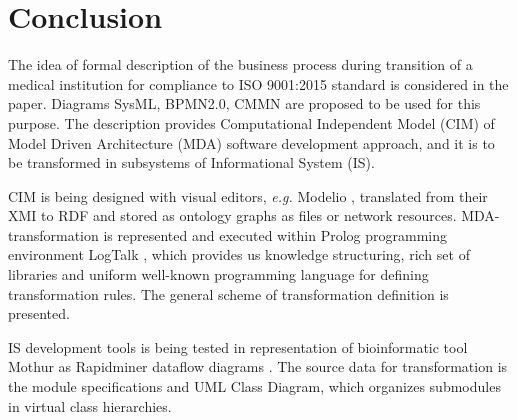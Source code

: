 \documentclass[conference]{IEEEtran}
\begin{document}


\section{Conclusion}

The idea of formal description of the business process during transition of a medical institution for compliance to ISO 9001:2015 standard is considered in the paper.  Diagrams SysML, BPMN2.0, CMMN are proposed to be used for this purpose.  The description provides Computational Independent Model (CIM) of Model Driven Architecture
(MDA) software development approach, and it is to be transformed in subsystems of Informational System (IS).

CIM is being designed with visual editors, \emph{e.g.} Modelio \cite{modelio}, translated from their XMI to RDF and stored as ontology graphs as files or network resources.  MDA-transformation is represented and executed within Prolog programming environment LogTalk \cite{tereh1}, which provides us knowledge structuring, rich set of libraries and uniform well-known programming language for defining transformation rules.  The general scheme of transformation definition is presented.

IS development tools is being tested in representation of bioinformatic tool Mothur as Rapidminer dataflow diagrams \cite{dataflow}.  The source data for transformation is the module specifications and UML Class Diagram, which organizes submodules in virtual class hierarchies.  %
\end{document}
